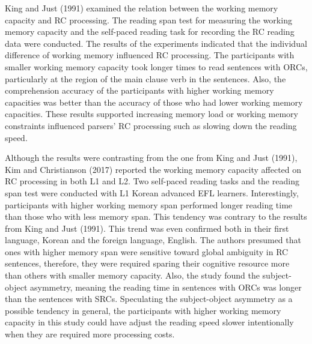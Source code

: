\documentclass[
]{article}
\begin{document}
King and Just (1991) examined the relation between the working memory
capacity and RC processing. The reading span test for measuring the
working memory capacity and the self-paced reading task for recording
the RC reading data were conducted. The results of the experiments
indicated that the individual difference of working memory influenced RC
processing. The participants with smaller working memory capacity took
longer times to read sentences with ORCs, particularly at the region of
the main clause verb in the sentences. Also, the comprehension accuracy
of the participants with higher working memory capacities was better
than the accuracy of those who had lower working memory capacities.
These results supported increasing memory load or working memory
constraints influenced parsers' RC processing such as slowing down the
reading speed.

Although the results were contrasting from the one from King and Just
(1991), Kim and Christianson (2017) reported the working memory capacity
affected on RC processing in both L1 and L2. Two self-paced reading
tasks and the reading span test were conducted with L1 Korean advanced
EFL learners. Interestingly, participants with higher working memory
span performed longer reading time than those who with less memory span.
This tendency was contrary to the results from King and Just (1991).
This trend was even confirmed both in their first language, Korean and
the foreign language, English. The authors presumed that ones with
higher memory span were sensitive toward global ambiguity in RC
sentences, therefore, they were required sparing their cognitive
resource more than others with smaller memory capacity. Also, the study
found the subject-object asymmetry, meaning the reading time in
sentences with ORCs was longer than the sentences with SRCs. Speculating
the subject-object asymmetry as a possible tendency in general, the
participants with higher working memory capacity in this study could
have adjust the reading speed slower intentionally when they are
required more processing costs.
\end{document}
